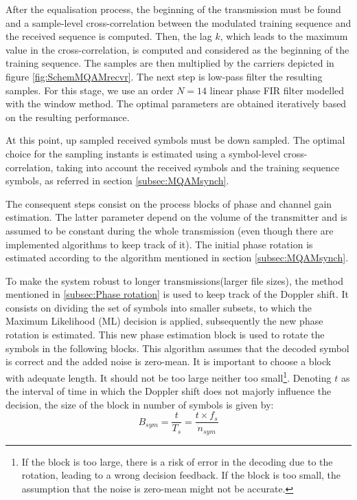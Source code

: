 \documentclass[12pt,a4paper,openright]{report}
\begin{document}
 
 After the equalisation process, the beginning of the transmission must be found and a sample-level cross-correlation between the modulated training sequence and the received sequence is computed. Then, the lag $k$, which leads to the maximum value in the cross-correlation, is computed and considered as the beginning  of the training sequence. The samples are then multiplied by the carriers depicted in figure \ref{fig:SchemMQAMrecvr}. The next step is low-pass filter the resulting samples. For this stage, we use an order $N=14$ linear phase FIR filter modelled with the window method. The optimal parameters are obtained iteratively based on the resulting performance. 
 
At this point, up sampled received symbols must be down sampled. The optimal choice for the sampling instants is estimated using a symbol-level cross-correlation, taking into account the received symbols and the training sequence symbols, as referred in section \ref{subsec:MQAMsynch}. 

The consequent steps consist on the process blocks of phase and channel gain estimation. The latter parameter depend on the volume of the transmitter and is assumed to be constant during the whole transmission (even though there are implemented algorithms to keep track of it). The initial phase rotation is estimated according to the algorithm mentioned in section \ref{subsec:MQAMsynch}.

To make the system robust to longer transmissions(larger file sizes), the method mentioned in \ref{subsec:Phase rotation} is used to keep track of the Doppler shift.  It consists on dividing the set of symbols into smaller subsets, to which the Maximum Likelihood (ML) decision is applied, subsequently the new phase rotation is estimated. This new phase estimation block is used to rotate the symbols in the following blocks. This algorithm assumes that the  decoded symbol is correct and the added noise is zero-mean. It is important to choose a block with adequate length. It should not be too large neither too small\footnote{If the block is too large, there is a risk of error in the decoding due to the rotation, leading to a wrong decision feedback. If the block is too small, the assumption that the noise is zero-mean might not be accurate.}.   Denoting $t$ as the interval of time in which the Doppler shift does not majorly influence the decision, the size of the block in number of symbols is given by:
\begin{equation}
B_{sym} = \frac{t}{T_s} = \frac{t\times f_s}{n_{sym}}
\end{equation}
\end{document}
